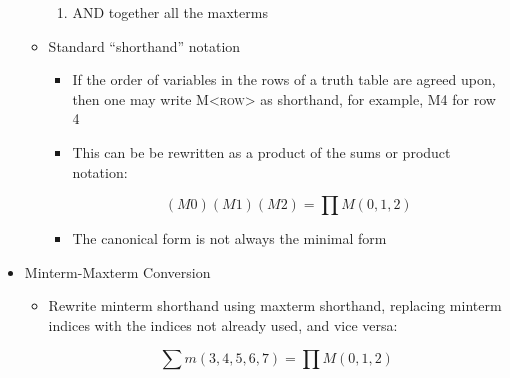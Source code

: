 \begin{itemize}
\begin{itemize}
\begin{enumerate}
          \item AND together all the maxterms

        \end{enumerate}

      \item Standard ``shorthand'' notation

        \begin{itemize}

          \item If the order of variables in the rows of a truth table are agreed upon, then one may write \textsc{M<row>} as shorthand, for example, \textsc{M4} for row 4

          \item This can be be rewritten as a product of the sums or product notation:

            $$(M0)(M1)(M2)=\prod M(0,1,2)$$

          \item The canonical form is not always the minimal form

        \end{itemize}

    \end{itemize}

  \item Minterm-Maxterm Conversion

    \begin{itemize}

      \item Rewrite minterm shorthand using maxterm shorthand, replacing minterm indices with the indices not already used, and vice versa:

        $$\sum m(3,4,5,6,7)=\prod M(0,1,2)$$

    \end{itemize}

\end{itemize}



